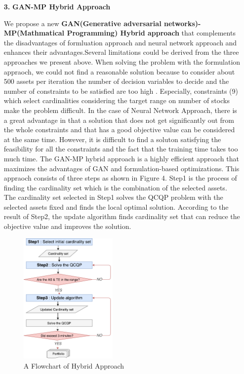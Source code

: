 \documentclass[11pt]{article}
\begin{document}
\begin{itemize}
\item[\textbf{3.}] \textbf{GAN-MP Hybrid Approach} %
	\item[] We propose a new \textbf{GAN(Generative adversarial networks)-MP(Mathmatical Programming) Hybrid approach} that complements the disadvantages of formluation approach and neural network approach and enhances their advantages.Several limitations could be derived from the three approaches we present above. When solving the problem with the formulation appraoch, we could not find a reasonable solution because to consider about 500 assets per iteration the number of decision variables to decide and the number of constraints to be satisfied are too high . Especially, constraints (9) which select cardinalities considering the target range on number of stocks make the problem difficult. 
	In the case of Neural Network Approach, there is a great advantage in that a solution that does not get significantly out from the whole constraints and that has a good objective value can be considered at the same time. However, it is difficult to find a soluton satisfying the feasibility for all the constraints and the fact that the training time takes too much time. The GAN-MP hybrid approach is a highly efficient approach that maximizes the advantages of GAN and formulation-based optimizations. This appraoch consists of three steps as shown in Figure 4. Step1 is the process of finding the cardinality set which is the combination of the selected assets. The cardinality set selected in Step1 solves the QCQP problem with the selected assets fixed and finds the local optimal solution. According to the result of Step2, the update algorithm finds cardinality set that can reduce the objective value and improves the solution.
	\begin{figure}[h] 
		\begin{center}
			\includegraphics[width=0.45\textwidth]{flowchart}
			\caption{A Flowchart of Hybrid Approach} \label{fig:flowchart}
		\end{center}
	\end{figure}


\end{itemize}
\end{document}
